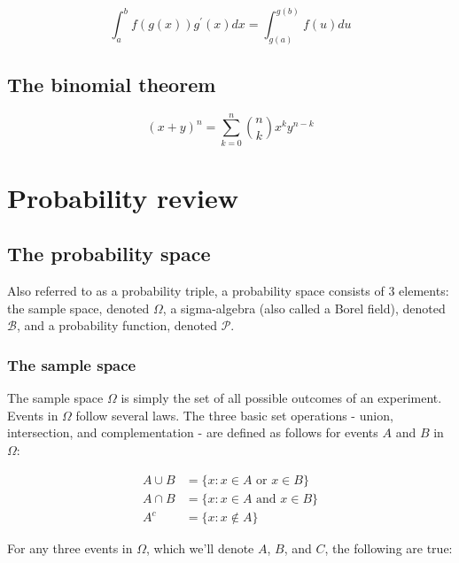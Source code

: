 \documentclass{report}
\begin{document}
\begin{equation}\label{eq:integral-by-sub}
    \int_a^b f(g(x))g^\prime(x) dx = \int_{g(a)}^{g(b)} f(u) du
\end{equation}

\subsection{The binomial theorem}

\begin{equation}\label{eq:binomial-theorem}
    (x + y)^n = \sum_{k=0}^n \binom{n}{k} x^ky^{n-k}
\end{equation}

\section{Probability review}\label{sec:tools-probability}

\subsection{The probability space}

Also referred to as a probability triple, a probability space consists of 3 elements: the sample space, denoted $\Omega$, a sigma-algebra (also called a Borel field), denoted $\mathcal{B}$, and a probability function, denoted $\mathcal{P}$. 

\subsubsection{The sample space}

The sample space $\Omega$ is simply the set of all possible outcomes of an experiment. Events in $\Omega$ follow several laws. The three basic set operations - union, intersection, and complementation - are defined as follows for events $A$ and $B$ in $\Omega$:

\begin{equation}\label{eq:set-union-intersection}
    \begin{aligned}
        A \cup B &= \{x: x \in A \text{ or } x \in B\} \\
        A \cap B &= \{x: x \in A \text{ and } x \in B\} \\
        A^c &= \{x: x \notin A\}
    \end{aligned}
\end{equation}

For any three events in $\Omega$, which we'll denote $A$, $B$, and $C$, the following are true:
\end{document}
